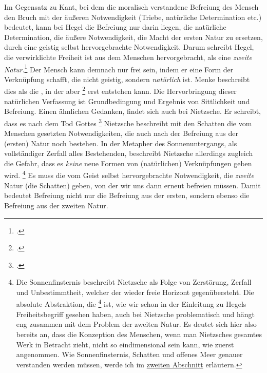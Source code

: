 \documentclass[12pt, a4paper, openany]{report}
\begin{document}
Im Gegensatz zu Kant, bei dem die moralisch verstandene Befreiung des Mensch den Bruch mit der äußeren Notwendigkeit (Triebe, natürliche Determination etc.) bedeutet, kann bei Hegel die Befreiung nur darin liegen, die natürliche Determination, die äußere Notwendigkeit, die Macht der ersten Natur zu ersetzen, durch eine geistig selbst hervorgebrachte Notwendigkeit.
Darum schreibt Hegel, die verwirklichte Freiheit ist aus dem Menschen hervorgebracht, als eine \emph{zweite Natur}.\footcite[Vlg.][§ 4, S. 34.]{hegel_grundlinien_2017}
Der Mensch kann demnach nur frei sein, indem er eine Form der Verknüpfung schafft, die nicht geistig, sondern \emph{natürlich} ist. 
Menke beschreibt dies als die , in der aber \footcite[][40. Hervorhebung von mir]{menke_autonomie_2018} erst entstehen kann.
Die Hervorbringung dieser natürlichen Verfassung ist Grundbedingung und Ergebnis von Sittlichkeit und Befreiung.
Einen ähnlichen Gedanken, findet sich auch bei Nietzsche. Er schreibt, dass es nach dem Tod Gottes \footcite[][467]{nietzsche_morgenrote_1999}
Nietzsche beschreibt mit den Schatten die vom Menschen gesetzten Notwendigkeiten, die auch nach der Befreiung aus der (ersten) Natur noch bestehen. 
In der Metapher des Sonnenuntergangs, als vollständiger Zerfall alles Bestehenden, beschreibt Nietzsche allerdings zugleich die Gefahr, dass es \emph{keine} neue Formen von (natürlichen) Verknüpfungen geben wird.%
\footnote{
    Die Sonnenfinsternis beschreibt Nietzsche als Folge von Zerstörung, Zerfall und Unbestimmtheit, welcher der wieder freie Horizont gegenübersteht. 
    Die absolute Abstraktion, die \footcite[][§ 5 A, S. 39.]{hegel_grundlinien_2017} ist, wie wir schon in der Einleitung zu Hegels Freiheitsbegriff gesehen haben, auch bei Nietzsche problematisch und hängt eng zusammen mit dem Problem der zweiten Natur.
    Es deutet sich hier also bereits an, dass die Konzeption des  Menschen, wenn man Nietzsches gesamtes Werk in Betracht zieht, nicht so eindimensional sein kann, wie zuerst angenommen.
    Wie Sonnenfinsternis, Schatten und offenes Meer genauer verstanden werden müssen, werde ich im \hyperref[abschnitt_2]{zweiten Abschnitt} erläutern.
}
Es muss die vom Geist selbst hervorgebrachte Notwendigkeit, die \emph{zweite} Natur (die Schatten) geben, von der wir uns dann erneut befreien müssen.
Damit bedeutet Befreiung nicht nur die Befreiung aus der ersten, sondern ebenso die Befreiung aus der zweiten Natur. 
\end{document}
